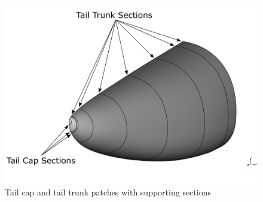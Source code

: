 \bigskip
%
\begin{figure}[H]
\centering
\includegraphics[scale=0.40]{Immagini/Capitolo3/tail_1}
\caption{Tail cap and tail trunk patches with supporting sections}
\label{fig:TailTrunkPlusTailCap}
\end{figure}
%

